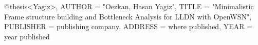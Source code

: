 @thesis{<Yagiz>,
 AUTHOR = "Oezkan, Hasan Yagiz",
 TITLE = "Minimalistic Frame structure building and Bottleneck Analysis for LLDN with OpenWSN",
 PUBLISHER = {publishing company},
 ADDRESS = {where published},
 YEAR = year published}